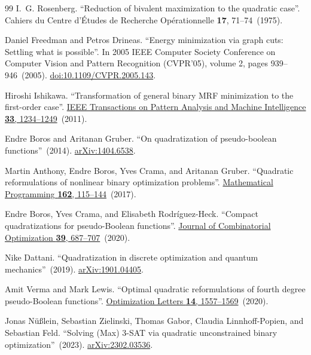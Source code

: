 \documentclass[a4paper,onecolumn,11pt,unpublished]{quantumarticle}
\theoremstyle{remark}
\begin{document}
\begin{thebibliography}{99}
I.~G. Rosenberg.
\newblock ``Reduction of bivalent maximization to the quadratic case''.
\newblock Cahiers du Centre d'\'Etudes de Recherche Op\'erationnelle {\bf 17}, 71--74~(1975).

Daniel Freedman and Petros Drineas.
\newblock ``Energy minimization via graph cuts: Settling what is possible''.
\newblock In 2005 IEEE Computer Society Conference on Computer Vision and Pattern Recognition (CVPR'05), volume 2, pages 939--946~(2005).
\newblock \href{https://dx.doi.org/10.1109/CVPR.2005.143}{doi:10.1109/CVPR.2005.143}.

Hiroshi Ishikawa.
\newblock ``Transformation of general binary MRF minimization to the first-order case''.
\newblock \href{https://dx.doi.org/10.1109/TPAMI.2010.91}{IEEE Transactions on Pattern Analysis and Machine Intelligence {\bf 33}, 1234--1249}~(2011).

Endre Boros and Aritanan Gruber.
\newblock ``On quadratization of pseudo-boolean functions''~(2014).
\newblock \href{http://arxiv.org/abs/1404.6538}{arXiv:1404.6538}.

Martin Anthony, Endre Boros, Yves Crama, and Aritanan Gruber.
\newblock ``Quadratic reformulations of nonlinear binary optimization problems''.
\newblock \href{https://dx.doi.org/10.1007/s10107-016-1032-4}{Mathematical Programming {\bf 162}, 115--144}~(2017).

Endre Boros, Yves Crama, and Elisabeth Rodr{\'i}guez-Heck.
\newblock ``Compact quadratizations for pseudo-Boolean functions''.
\newblock \href{https://dx.doi.org/10.1007/s10878-019-00511-0}{Journal of Combinatorial Optimization {\bf 39}, 687--707}~(2020).

Nike Dattani.
\newblock ``Quadratization in discrete optimization and quantum mechanics''~(2019).
\newblock \href{http://arxiv.org/abs/1901.04405}{arXiv:1901.04405}.

Amit Verma and Mark Lewis.
\newblock ``Optimal quadratic reformulations of fourth degree pseudo-Boolean functions''.
\newblock \href{https://dx.doi.org/10.1007/s11590-019-01460-7}{Optimization Letters {\bf 14}, 1557--1569}~(2020).

Jonas N{\"u}{\ss}lein, Sebastian Zielinski, Thomas Gabor, Claudia Linnhoff-Popien, and Sebastian Feld.
\newblock ``Solving (Max) 3-SAT via quadratic unconstrained binary optimization''~(2023).
\newblock \href{http://arxiv.org/abs/2302.03536}{arXiv:2302.03536}.


\end{thebibliography}
\end{document}
